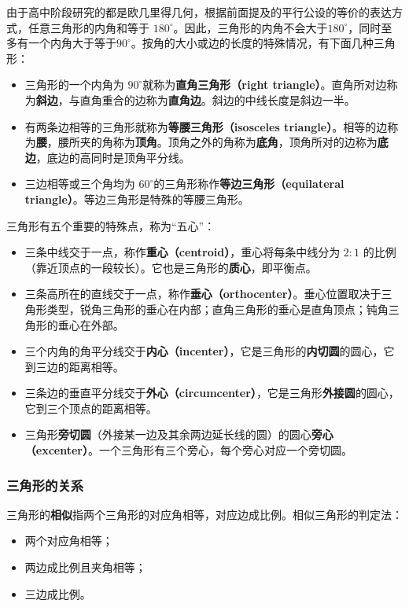 由于高中阶段研究的都是欧几里得几何，根据前面提及的平行公设的等价的表达方式，任意三角形的内角和等于 $180^\circ$。因此，三角形的内角不会大于$180^\circ$，同时至多有一个内角大于等于$90^\circ$。按角的大小或边的长度的特殊情况，有下面几种三角形：
\begin{itemize}
\item 三角形的一个内角为 $90^\circ$就称为\textbf{直角三角形（right triangle）}。直角所对边称为\textbf{斜边}，与直角重合的边称为\textbf{直角边}。斜边的中线长度是斜边一半。
\item 有两条边相等的三角形就称为\textbf{等腰三角形（isosceles triangle）}。相等的边称为\textbf{腰}，腰所夹的角称为\textbf{顶角}。顶角之外的角称为\textbf{底角}，顶角所对的边称为\textbf{底边}，底边的高同时是顶角平分线。
\item 三边相等或三个角均为 $60^\circ$的三角形称作\textbf{等边三角形（equilateral triangle）}。等边三角形是特殊的等腰三角形。
\end{itemize}

三角形有五个重要的特殊点，称为“五心”：
\begin{itemize}
\item 三条中线交于一点，称作\textbf{重心（centroid）}，重心将每条中线分为 $2:1$ 的比例（靠近顶点的一段较长）。它也是三角形的\textbf{质心}，即平衡点。
\item 三条高所在的直线交于一点，称作\textbf{垂心（orthocenter）}。垂心位置取决于三角形类型，锐角三角形的垂心在内部；直角三角形的垂心是直角顶点；钝角三角形的垂心在外部。
\item 三个内角的角平分线交于\textbf{内心（incenter）}，它是三角形的\textbf{内切圆}的圆心，它到三边的距离相等。
\item 三条边的垂直平分线交于\textbf{外心（circumcenter）}，它是三角形\textbf{外接圆}的圆心，它到三个顶点的距离相等。
\item 三角形\textbf{旁切圆}（外接某一边及其余两边延长线的圆）的圆心\textbf{旁心（excenter）}。一个三角形有三个旁心，每个旁心对应一个旁切圆。
\end{itemize}

\subsubsection{三角形的关系}

三角形的\textbf{相似}指两个三角形的对应角相等，对应边成比例。相似三角形的判定法：
\begin{itemize}
\item 两个对应角相等；
\item 两边成比例且夹角相等；
\item 三边成比例。
\end{itemize}

